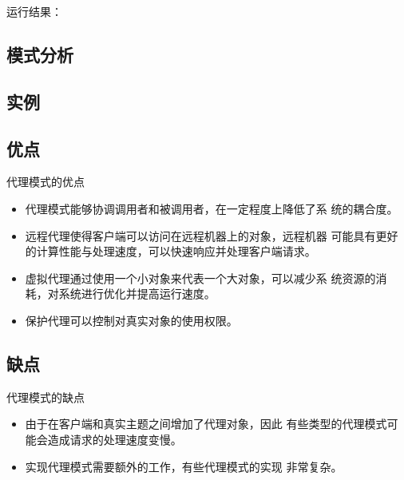 \documentclass[letterpaper,10pt,english]{sphinxmanual}
\begin{document}
\sphinxAtStartPar
运行结果：

\noindent{}


\subsection{模式分析}
\label{\detokenize{structural_patterns/proxy:id8}}

\subsection{实例}
\label{\detokenize{structural_patterns/proxy:id9}}

\subsection{优点}
\label{\detokenize{structural_patterns/proxy:id10}}
\sphinxAtStartPar
代理模式的优点
\begin{itemize}
\item {} 
\sphinxAtStartPar
代理模式能够协调调用者和被调用者，在一定程度上降低了系 统的耦合度。

\item {} 
\sphinxAtStartPar
远程代理使得客户端可以访问在远程机器上的对象，远程机器 可能具有更好的计算性能与处理速度，可以快速响应并处理客户端请求。

\item {} 
\sphinxAtStartPar
虚拟代理通过使用一个小对象来代表一个大对象，可以减少系 统资源的消耗，对系统进行优化并提高运行速度。

\item {} 
\sphinxAtStartPar
保护代理可以控制对真实对象的使用权限。

\end{itemize}


\subsection{缺点}
\label{\detokenize{structural_patterns/proxy:id11}}
\sphinxAtStartPar
代理模式的缺点
\begin{itemize}
\item {} 
\sphinxAtStartPar
由于在客户端和真实主题之间增加了代理对象，因此 有些类型的代理模式可能会造成请求的处理速度变慢。

\item {} 
\sphinxAtStartPar
实现代理模式需要额外的工作，有些代理模式的实现 非常复杂。

\end{itemize}
\end{document}
